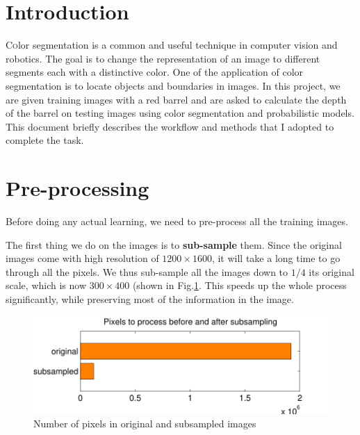 \documentclass[twoside]{article}
\begin{document}
\begin{multicols}{2} %

\section{Introduction}
\lettrine[nindent=0em,lines=2]{C}olor segmentation is a common and useful technique in computer vision and robotics. The goal is to change the representation of an image to different segments each with a distinctive color. One of the application of color segmentation is to locate objects and boundaries in images. In this project, we are given training images with a red barrel and are asked to calculate the depth of the barrel on testing images using color segmentation and probabilistic models. This document briefly describes the workflow and methods that I adopted to complete the task.


\section{Pre-processing}
Before doing any actual learning, we need to pre-process all the training images.

The first thing we do on the images is to \textbf{sub-sample} them. Since the original images come with high resolution of $1200\times 1600$, it will take a long time to go through all the pixels. We thus sub-sample all the images down to $1/4$ its original scale, which is now $300\times 400$ (shown in Fig.\ref{fig:pixel_reduced}. This speeds up the whole process significantly, while preserving most of the information in the image.

\begin{figure}[H]
  \centering
  \includegraphics[width=\columnwidth]{pixel_reduced.pdf}
    \caption{Number of pixels in original and subsampled images}
    \label{fig:pixel_reduced}
\end{figure}


\end{multicols}
\end{document}
